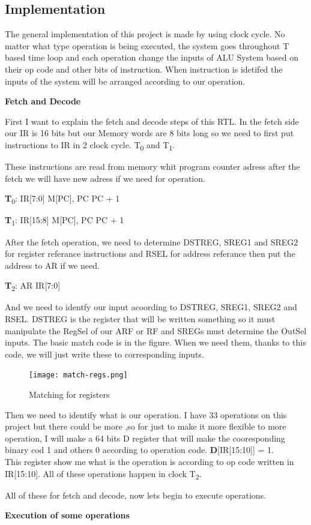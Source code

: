 \documentclass[pdftex,12pt,a4paper]{article}
\begin{document}
	\subsection{Implementation}
	The general implementation of this project is made by using clock cycle. No matter what type operation is being executed, the system goes throughout T based time loop and each operation change the inputs of ALU System based on their op code and other bits of instruction. When instruction is idetifed the inputs of the system will be arranged according to our operation.\par
	\textbf{Fetch and Decode}\par
	First I want to explain the fetch and decode steps of this RTL. In the fetch side our IR is 16 bits but our Memory words are 8 bits long so we need to first put instructions to IR in 2 clock cycle. T\textsubscript{0} and T\textsubscript{1}.\par
	These instructions are read from memory whit program counter adress after the fetch we will have new adress if we need for operation.\par
	\textbf{T}\textsubscript{0}: IR[7:0] \xleftarrow{}M[PC], PC \xleftarrow{} PC + 1\par
	\textbf{T}\textsubscript{1}: IR[15:8] \xleftarrow{}M[PC], PC \xleftarrow{} PC + 1\par
	After the fetch operation, we need to determine DSTREG, SREG1 and SREG2 for register referance instructions and RSEL for address referance then put the address to AR if we need.\par
	\textbf{T}\textsubscript{2}: AR \xleftarrow{} IR[7:0]\par
	And we need to identfy our input acoording to DSTREG, SREG1, SREG2 and RSEL. DSTREG is the register that will be written something so it must manipulate the RegSel of our ARF or RF and SREGs must determine the OutSel inputs. The basic match code is in the figure.
	When we need them, thanks to this code, we will just write these to corresponding inputs. 
	\begin{figure}[H]
		\centering
		\texttt{[image: match-regs.png]}
		\caption{Matching for registers}
		\label{fig:Operation Codes}
	\end{figure}\par 
	Then we need to identify what is our operation. I have 33 operations on this project but there could be more ,so for just to make it more flexible to more operation, I will make a 64 bits D register that will make the cooresponding binary cod 1 and others 0 according to operation code.\newpage
	\textbf{D}[IR[15:10]] = 1.\\
	This register show me what is the operation is according to op code written in IR[15:10]. All of these operations happen in clock T\textsubscript{2}.\par
	All of these for fetch and decode, now lets begin to execute operations. \par
	\textbf{Execution of some operations} \par
	
\end{document}
